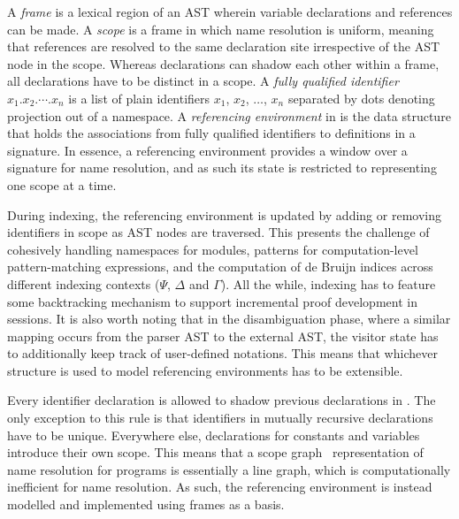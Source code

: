 
A \textit{frame} is a lexical region of an \ac{AST} wherein variable declarations and references can be made.
A \textit{scope} is a frame in which name resolution is uniform, meaning that references are resolved to the same declaration site irrespective of the \ac{AST} node in the scope.
Whereas declarations can shadow each other within a frame, all declarations have to be distinct in a scope.
A \textit{fully qualified identifier} $x_1.x_2.\cdots.x_n$ is a list of plain identifiers $x_1$, $x_2$, $\dots$, $x_n$ separated by dots denoting projection out of a namespace.
A \textit{referencing environment} in \Beluga is the data structure that holds the associations from fully qualified identifiers to definitions in a signature.
In essence, a referencing environment provides a window over a signature for name resolution, and as such its state is restricted to representing one scope at a time.

During indexing, the referencing environment is updated by adding or removing identifiers in scope as \ac{AST} nodes are traversed.
This presents the challenge of cohesively handling namespaces for modules, patterns for computation-level pattern-matching expressions, and the computation of de Bruijn indices across different indexing contexts ($\Psi$, $\Delta$ and $\Gamma$).
All the while, indexing has to feature some backtracking mechanism to support incremental proof development in \Harpoon sessions.
It is also worth noting that in the disambiguation phase, where a similar mapping occurs from the parser \ac{AST} to the external \ac{AST}, the visitor state has to additionally keep track of user-defined notations.
This means that whichever structure is used to model referencing environments has to be extensible.


Every identifier declaration is allowed to shadow previous declarations in \Beluga.
The only exception to this rule is that identifiers in mutually recursive declarations have to be unique.
Everywhere else, declarations for constants and variables introduce their own scope.
This means that a scope graph~\cite{nameresolution} representation of name resolution for \Beluga programs is essentially a line graph, which is computationally inefficient for name resolution.
As such, the referencing environment is instead modelled and implemented using frames as a basis.

